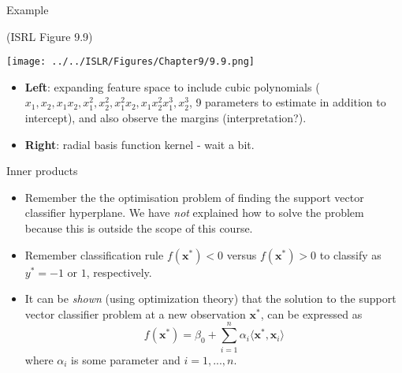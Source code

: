 \documentclass[10pt,ignorenonframetext,]{beamer}
\begin{document}
\begin{frame}

\begin{block}{Example}

(ISRL Figure 9.9)

\centering

\texttt{[image: ../../ISLR/Figures/Chapter9/9.9.png]}

\flushleft

\begin{itemize}
\item
  \textbf{Left}: expanding feature space to include cubic polynomials
  (\(x_1,x_2,x_1x_2,x_1^2,x_2^2,x_1^2x_2,x_1x_2^2x_1^3,x_2^3\), 9
  parameters to estimate in addition to intercept), and also observe the
  margins (interpretation?).
\item
  \textbf{Right}: radial basis function kernel - wait a bit.
\end{itemize}

\end{block}

\end{frame}

\begin{frame}

\begin{block}{Inner products}

\begin{itemize}
\item
  Remember the the optimisation problem of finding the support vector
  classifier hyperplane. We have \emph{not} explained how to solve the
  problem because this is outside the scope of this course.
\item
  Remember classification rule \(f({\boldsymbol x}^*)<0\) versus
  \(f({\boldsymbol x}^*)>0\) to classify as \(y^* = -1\) or \(1\),
  respectively.
\item
  It can be \emph{shown} (using optimization theory) that the solution
  to the support vector classifier problem at a new observation
  \({\boldsymbol x}^*\), can be expressed as \[
  f({\boldsymbol x}^*)=\beta_0 + \sum_{i=1}^n \alpha_i \langle {\boldsymbol x}^*,{\boldsymbol x}_i \rangle
  \] where \(\alpha_i\) is some parameter and \(i=1,...,n\).
\end{itemize}

\end{block}

\end{frame}
\end{document}
